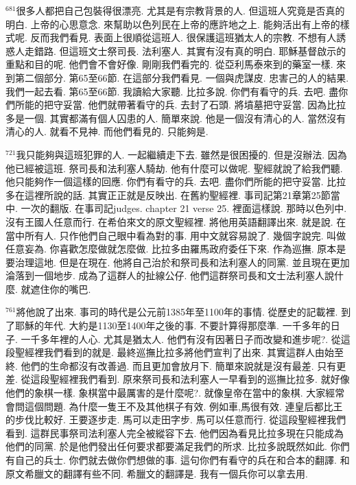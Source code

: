 \documentclass{book}
\begin{document}
$^{681}$很多人都把自己包裝得很漂亮.
尤其是有宗教背景的人.
但這班人究竟是否真的明白.
上帝的心思意念.
來幫助以色列民在上帝的應許地之上.
能夠活出有上帝的樣式呢.
反而我們看見.
表面上很順從這班人.
很保護這班猶太人的宗教.
不想有人誘惑人走錯路.
但這班文士祭司長.
法利塞人.
其實有沒有真的明白.
耶穌基督啟示的重點和目的呢.
他們會不會好像.
剛剛我們看完的.
從亞利馬泰來到的藥室一樣.
來到第二個部分.
第65至66節.
在這部分我們看見.
一個與虎謀皮.
忠害己的人的結果.
我們一起去看.
第65至66節.
我讀給大家聽.
比拉多說.
你們有看守的兵.
去吧.
盡你們所能的把守妥當.
他們就帶著看守的兵.
去封了石頭.
將墳墓把守妥當.
因為比拉多是一個.
其實都滿有個人囚患的人.
簡單來說.
他是一個沒有清心的人.
當然沒有清心的人.
就看不見神.
而他們看見的.
只能夠是.

$^{721}$我只能夠與這班犯罪的人.
一起繼續走下去.
雖然是很困擾的.
但是沒辦法.
因為他已經被這班.
祭司長和法利塞人騎劫.
他有什麼可以做呢.
聖經就說了給我們聽.
他只能夠作一個這樣的回應.
你們有看守的兵.
去吧.
盡你們所能的把守妥當.
比拉多在這裡所說的話.
其實正正就是反映出.
在舊約聖經裡.
事司記第21章第25節當中.
一次的翻版.
在事司記judges.
chapter 21 verse 25.
裡面這樣說.
那時以色列中.
沒有王國人任意而行.
在希伯來文的原文聖經裡.
將他用英語翻譯出來.
就是說.
在當中所有人.
只作他們自己眼中看為對的事.
用中文就容易說了.
幾個字說完.
叫做任意妄為.
你喜歡怎麼做就怎麼做.
比拉多由羅馬政府委任下來.
作為巡撫.
原本是要治理這地.
但是在現在.
他將自己治於和祭司長和法利塞人的同黨.
並且現在更加淪落到一個地步.
成為了這群人的扯線公仔.
他們這群祭司長和文士法利塞人說什麼.
就遮住你的嘴巴.

$^{761}$將他說了出來.
事司的時代是公元前1385年至1100年的事情.
從歷史的記載裡.
到了耶穌的年代.
大約是1130至1400年之後的事.
不要計算得那麼準.
一千多年的日子.
一千多年裡的人心.
尤其是猶太人.
他們有沒有因著日子而改變和進步呢?.
從這段聖經裡我們看到的就是.
最終巡撫比拉多將他們宣判了出來.
其實這群人由始至終.
他們的生命都沒有改善過.
而且更加會放月下.
簡單來說就是沒有最差.
只有更差.
從這段聖經裡我們看到.
原來祭司長和法利塞人一早看到的巡撫比拉多.
就好像他們的象棋一樣.
象棋當中最厲害的是什麼呢?.
就像皇帝在當中的象棋.
大家經常會問這個問題.
為什麼一隻王不及其他棋子有效.
例如車,馬很有效.
連皇后都比王的步伐比較好.
王要逐步走.
馬可以走田字步.
馬可以任意而行.
從這段聖經裡我們看到.
這群民事祭司法利塞人完全被縱容下去.
他們因為看見比拉多現在只能成為他們的同黨.
於是他們發出任何要求都要滿足我們的所求.
比拉多說既然如此.
你們有自己的兵士.
你們就去做你們想做的事.
這句你們有看守的兵在和合本的翻譯.
和原文希臘文的翻譯有些不同.
希臘文的翻譯是.
我有一個兵你可以拿去用.
\end{document}
